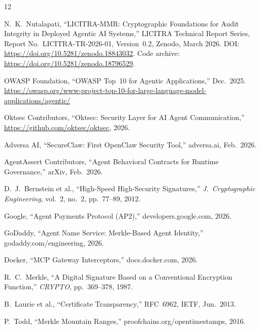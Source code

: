 \documentclass[11pt,a4paper]{article}
\begin{document}
\begin{thebibliography}{12}

N.~K.~Nutalapati,
``LICITRA-MMR: Cryptographic Foundations for Audit Integrity in Deployed Agentic AI Systems,''
LICITRA Technical Report Series, Report No.\ LICITRA-TR-2026-01, Version~0.2,
Zenodo, March 2026.
DOI: \url{https://doi.org/10.5281/zenodo.18843032}.
Code archive: \url{https://doi.org/10.5281/zenodo.18796529}.

OWASP Foundation,
``OWASP Top~10 for Agentic Applications,'' Dec.\ 2025.
\url{https://owasp.org/www-project-top-10-for-large-language-model-applications/agentic/}

Oktsec Contributors,
``Oktsec: Security Layer for AI Agent Communication,''
\url{https://github.com/oktsec/oktsec}, 2026.

Adversa AI,
``SecureClaw: First OpenClaw Security Tool,''
adversa.ai, Feb.\ 2026.

AgentAssert Contributors,
``Agent Behavioral Contracts for Runtime Governance,''
arXiv, Feb.\ 2026.

D.~J.~Bernstein et al.,
``High-Speed High-Security Signatures,''
\emph{J.\ Cryptographic Engineering}, vol.~2, no.~2, pp.~77--89, 2012.

Google,
``Agent Payments Protocol (AP2),''
developers.google.com, 2026.

GoDaddy,
``Agent Name Service: Merkle-Based Agent Identity,''
godaddy.com/engineering, 2026.

Docker,
``MCP Gateway Interceptors,''
docs.docker.com, 2026.

R.~C.~Merkle,
``A Digital Signature Based on a Conventional Encryption Function,''
\emph{CRYPTO}, pp.~369--378, 1987.

B.~Laurie et al.,
``Certificate Transparency,''
RFC~6962, IETF, Jun.\ 2013.

P.~Todd,
``Merkle Mountain Ranges,''
proofchains.org/opentimestamps, 2016.

\end{thebibliography}


\appendix
\end{document}
